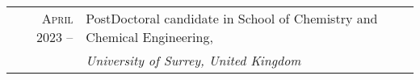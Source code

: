 %
%





\begin{tabular}{rl}
    \textsc{April 2023 --}            & PostDoctoral candidate in School of Chemistry and Chemical Engineering,\\
                                     &  \emph{University of Surrey, United Kingdom}  \\
\end{tabular}
